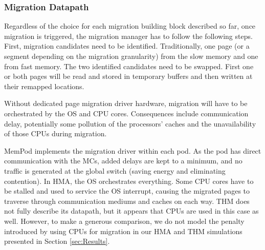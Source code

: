 
\subsubsection{Migration Datapath}

Regardless of the choice for each migration building block described so far, once migration is triggered, the migration manager has to follow the following 
steps. First, migration candidates need to be identified. Traditionally, one page (or a segment depending on the migration granularity) from the slow memory and one from fast memory. The two identified candidates need to be swapped. First one or both pages will be read and stored in temporary buffers and then written at their remapped locations.

Without dedicated page migration driver hardware, migration will have to be orchestrated by the OS and CPU cores. Consequences include communication delay, 
potentially some pollution of the processors' caches 
and the unavailability of those CPUs during migration. 

MemPod implements the migration driver within each pod. As the pod has direct communication with the MCs, added delays are kept to a minimum,
and no traffic is generated at the global switch (saving energy and eliminating contention).
In HMA, the OS orchestrates everything. Some CPU cores have to be stalled and used to service the OS interrupt, causing the migrated pages to traverse through communication mediums and caches on each way. THM does not fully describe its datapath, but it appears that CPUs are used in this case as well. 
However, to make a generous comparison, we do not model the penalty introduced by using CPUs for migration in our HMA and THM simulations presented in Section \ref{sec:Results}.



